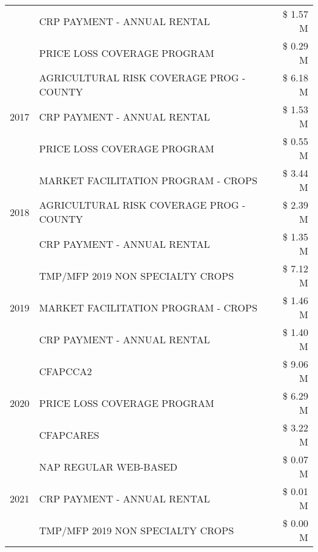 \begin{tabular}{llr}
 & CRP PAYMENT - ANNUAL RENTAL & \$ 1.57 M \\
 & PRICE LOSS COVERAGE PROGRAM & \$ 0.29 M \\
\cline{1-3}
\multirow[t]{3}{*}{2017} & AGRICULTURAL RISK COVERAGE PROG - COUNTY & \$ 6.18 M \\
 & CRP PAYMENT - ANNUAL RENTAL & \$ 1.53 M \\
 & PRICE LOSS COVERAGE PROGRAM & \$ 0.55 M \\
\cline{1-3}
\multirow[t]{3}{*}{2018} & MARKET FACILITATION PROGRAM - CROPS & \$ 3.44 M \\
 & AGRICULTURAL RISK COVERAGE PROG - COUNTY & \$ 2.39 M \\
 & CRP PAYMENT - ANNUAL RENTAL & \$ 1.35 M \\
\cline{1-3}
\multirow[t]{3}{*}{2019} & TMP/MFP 2019 NON SPECIALTY CROPS & \$ 7.12 M \\
 & MARKET FACILITATION PROGRAM - CROPS & \$ 1.46 M \\
 & CRP PAYMENT - ANNUAL RENTAL & \$ 1.40 M \\
\cline{1-3}
\multirow[t]{3}{*}{2020} & CFAPCCA2 & \$ 9.06 M \\
 & PRICE LOSS COVERAGE PROGRAM & \$ 6.29 M \\
 & CFAPCARES & \$ 3.22 M \\
\cline{1-3}
\multirow[t]{3}{*}{2021} & NAP REGULAR WEB-BASED & \$ 0.07 M \\
 & CRP PAYMENT - ANNUAL RENTAL & \$ 0.01 M \\
 & TMP/MFP 2019 NON SPECIALTY CROPS & \$ 0.00 M \\
\cline{1-3}
\bottomrule
\end{tabular}
